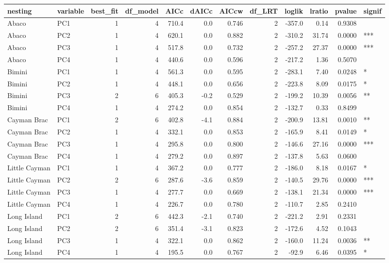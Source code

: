 
\begin{tabular}{llrrrrrrrrrl}
\toprule
nesting & variable & best\_fit & df\_model & AICc & dAICc & AICcw & df\_LRT & loglik & lratio & pvalue & signif\\
\midrule
Abaco & PC1 & 1 & 4 & 710.4 & 0.0 & 0.746 & 2 & -357.0 & 0.14 & 0.9308 & \\
Abaco & PC2 & 1 & 4 & 620.1 & 0.0 & 0.882 & 2 & -310.2 & 31.74 & 0.0000 & ***\\
Abaco & PC3 & 1 & 4 & 517.8 & 0.0 & 0.732 & 2 & -257.2 & 27.37 & 0.0000 & ***\\
Abaco & PC4 & 1 & 4 & 440.6 & 0.0 & 0.596 & 2 & -217.2 & 1.36 & 0.5070 & \\
Bimini & PC1 & 1 & 4 & 561.3 & 0.0 & 0.595 & 2 & -283.1 & 7.40 & 0.0248 & *\\
\addlinespace
Bimini & PC2 & 1 & 4 & 448.1 & 0.0 & 0.656 & 2 & -223.8 & 8.09 & 0.0175 & *\\
Bimini & PC3 & 2 & 6 & 405.3 & -0.2 & 0.529 & 2 & -199.2 & 10.39 & 0.0056 & **\\
Bimini & PC4 & 1 & 4 & 274.2 & 0.0 & 0.854 & 2 & -132.7 & 0.33 & 0.8499 & \\
Cayman Brac & PC1 & 2 & 6 & 402.8 & -4.1 & 0.884 & 2 & -200.9 & 13.81 & 0.0010 & **\\
Cayman Brac & PC2 & 1 & 4 & 332.1 & 0.0 & 0.853 & 2 & -165.9 & 8.41 & 0.0149 & *\\
\addlinespace
Cayman Brac & PC3 & 1 & 4 & 295.8 & 0.0 & 0.800 & 2 & -146.6 & 27.16 & 0.0000 & ***\\
Cayman Brac & PC4 & 1 & 4 & 279.2 & 0.0 & 0.897 & 2 & -137.8 & 5.63 & 0.0600 & \\
Little Cayman & PC1 & 1 & 4 & 367.2 & 0.0 & 0.777 & 2 & -186.0 & 8.18 & 0.0167 & *\\
Little Cayman & PC2 & 2 & 6 & 287.6 & -3.6 & 0.859 & 2 & -140.5 & 29.76 & 0.0000 & ***\\
Little Cayman & PC3 & 1 & 4 & 277.7 & 0.0 & 0.669 & 2 & -138.1 & 21.34 & 0.0000 & ***\\
\addlinespace
Little Cayman & PC4 & 1 & 4 & 226.7 & 0.0 & 0.780 & 2 & -110.7 & 2.85 & 0.2410 & \\
Long Island & PC1 & 2 & 6 & 442.3 & -2.1 & 0.740 & 2 & -221.2 & 2.91 & 0.2331 & \\
Long Island & PC2 & 2 & 6 & 351.4 & -3.1 & 0.823 & 2 & -172.6 & 4.52 & 0.1043 & \\
Long Island & PC3 & 1 & 4 & 322.1 & 0.0 & 0.862 & 2 & -160.0 & 11.24 & 0.0036 & **\\
Long Island & PC4 & 1 & 4 & 195.5 & 0.0 & 0.767 & 2 & -92.9 & 6.46 & 0.0395 & *\\
\bottomrule
\end{tabular}
